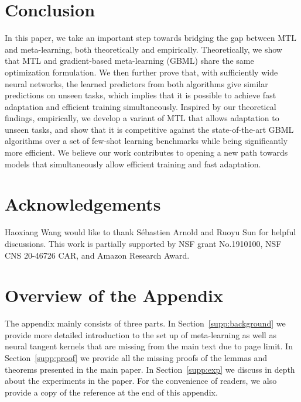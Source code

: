 \documentclass{article}
\begin{document}
\section{Conclusion}
In this paper, we take an important step towards bridging the gap between MTL and meta-learning, both theoretically and empirically. Theoretically, we show that MTL and gradient-based meta-learning (GBML) share the same optimization formulation. We then further prove that, with sufficiently wide neural networks, the learned predictors from both algorithms give similar predictions on unseen tasks, which implies that it is possible to achieve fast adaptation and efficient training simultaneously. Inspired by our theoretical findings, empirically, we develop a variant of MTL that allows adaptation to unseen tasks, and show that it is competitive against the state-of-the-art GBML algorithms over a set of few-shot learning benchmarks while being significantly more efficient. We believe our work contributes to opening a new path towards models that simultaneously allow efficient training and fast adaptation. 

\vspace{-1em}
\section*{Acknowledgements}
Haoxiang Wang would like to thank Sébastien Arnold and Ruoyu Sun for helpful discussions. This work is partially supported by NSF grant No.1910100, NSF CNS 20-46726 CAR, and Amazon Research Award.

\newpage







\onecolumn
\newpage
\appendix
{}
\section*{Overview of the Appendix}
The appendix mainly consists of three parts. In Section~\ref{supp:background} we provide more detailed introduction to the set up of meta-learning as well as neural tangent kernels that are missing from the main text due to page limit. In Section~\ref{supp:proof} we provide all the missing proofs of the lemmas and theorems presented in the main paper. In Section~\ref{supp:exp} we discuss in depth about the experiments in the paper. For the convenience of readers, we also provide a copy of the reference at the end of this appendix. 
\end{document}
